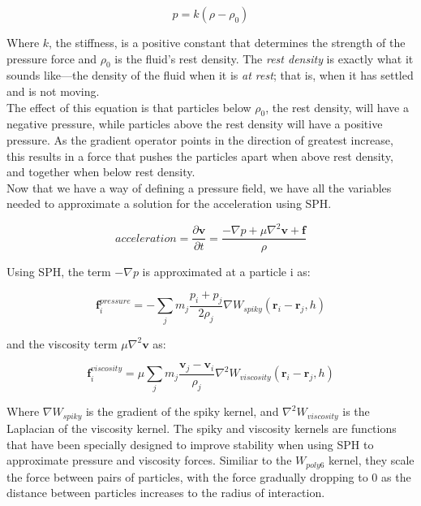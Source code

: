 \documentclass[]{article}
\begin{document}
	\begin{equation}
		\label{eq_densityToPressure}
		p = k(\rho - \rho_0)
	\end{equation}
	
	Where \( k \), the stiffness, is a positive constant that determines the strength of the pressure force and 
	\( \rho_0 \) is the fluid's rest density. The \textit{rest density} is exactly what it sounds like---the density of the 
	fluid when it is \textit{at rest}; that is, when it has settled and is not moving.\\
	
	The effect of this equation is that particles below \(\rho_0\), the rest density, will have a negative pressure, 
	while particles above the rest density will have a positive pressure. As the gradient operator points in the 
	direction of greatest increase, this results in a force that pushes the particles apart when above rest density,
	and together when below rest density.\\
	
	Now that we have a way of defining a pressure field, we have all the variables needed to approximate a solution
	for the acceleration using SPH.
	
	\begin{equation}
	acceleration = \frac{\partial \mathbf{v}}{\partial t} = \frac{- \nabla p + \mu \nabla ^2 \mathbf{v} + \mathbf{f}}{\rho}
	\end{equation}
	
	Using SPH, the term \(- \nabla p\) is approximated at a particle i as:
	
	\begin{equation}
		\mathbf{f}_{i}^{pressure} = - \sum_{j}^{} m_j \frac{p_i + p_j}{2 \rho_j} \nabla W_{spiky}(\mathbf{r}_i - \mathbf{r}_j, h)
	\end{equation}
	
	and the viscosity term \(\mu \nabla ^2 \mathbf{v} \) as:
	
	\begin{equation}
		\mathbf{f}_{i}^{viscosity} = \mu \sum_{j}^{} m_j \frac{ \mathbf{v}_j - \mathbf{v}_i}{\rho_j} \nabla ^ 2 W_{viscosity}(\mathbf{r}_i - \mathbf{r}_j, h)
	\end{equation}
	
	Where \( \nabla W_{spiky} \) is the gradient of the spiky kernel, and \( \nabla ^ 2 W_{viscosity} \) is the 
	Laplacian of the viscosity kernel. The spiky and viscosity kernels are functions that have been specially designed
	to improve stability when using SPH to approximate pressure and viscosity forces. Similiar to the \(W_{poly6}\) kernel,
	they scale the force between pairs of particles, with the force gradually dropping to 0 as the distance between particles
	increases to the radius of interaction.\\
	
\end{document}
